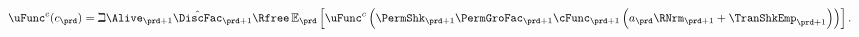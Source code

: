   \begin{equation}\begin{gathered}\begin{aligned}
        \uFunc^{{c}}({c}_{\prd}) & = \beth\Alive_{\prd+1}\hat{\DiscFac}_{\prd+1}\Rfree \Ex_{\prd}\left[\uFunc^{{c}}\left(\PermShk_{\prd+1}\PermGroFac_{\prd+1}\cFunc_{\prd+1}\left({a}_{\prd}\RNrm_{\prd+1}+\TranShkEmp_{\prd+1}\right)\right)\right]\label{eq:FOCLifeCycle}
        .
      \end{aligned}\end{gathered}\end{equation}
